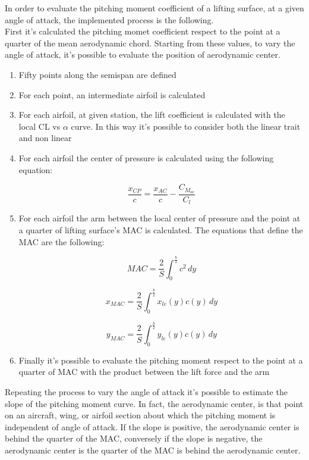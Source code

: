 In order to evaluate the pitching moment coefficient of a lifting surface, at a given angle of attack, the implemented process is the following.\\
First it's calculated the pitching momet coefficient respect to the point at a quarter of the mean aerodynamic chord. Starting from these values, to vary the angle of attack, it's possible to evaluate the position of aerodynamic center.

\begin{enumerate}
\item Fifty points along the semispan are defined
\item For each point, an intermediate airfoil is calculated
\item For each airfoil, at given station, the lift coefficient is calculated with the local CL vs $\alpha$ curve. In this way it's possible to consider both the linear trait and non linear
\item For each airfoil the center of pressure is calculated using the following equation:

\begin {equation}
\frac{x_{CP}}{c} = \frac{x_{AC}}{c} - \frac{C_{M_{ac}}}{C_l}
\end{equation}

\item For each airfoil the arm between the local center of pressure and the point at a quarter of lifting surface's MAC is calculated. The equations that define the MAC are the following:

\begin{equation}
MAC=\frac{2}{S} \int_{0}^{\frac{b}{2}} c^2\, dy
\end{equation}

\begin{equation}
x_{MAC}=\frac{2}{S} \int_{0}^{\frac{b}{2}}x_{le}(y) c(y)\, dy
\end{equation}

\begin{equation}
y_{MAC}=\frac{2}{S} \int_{0}^{\frac{b}{2}}y_{le}(y) c(y)\, dy
\end{equation}

\item Finally it's possible to evaluate the pitching moment respect to the point at a quarter of MAC with the product between the lift force and the arm
\end{enumerate}


Repeating the process to vary the angle of attack it's possible to estimate the slope of the pitching moment curve.  In fact, the aerodynamic center, is that point on an aircraft, wing, or airfoil section about which the pitching moment is independent of angle of attack.
If the slope is positive, the aerodynamic center is behind the quarter of the MAC, conversely if the slope is negative, the aerodynamic center is the quarter of the MAC is behind the aerodynamic center.

